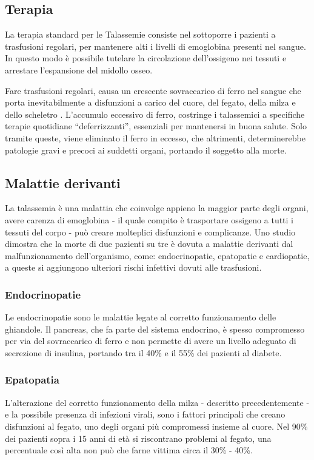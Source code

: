 \documentclass[12pt,a4paper,openright,twoside]{report}
\begin{document}
\subsection{Terapia}
La terapia standard per le Talassemie consiste nel sottoporre i pazienti a trasfusioni regolari, per mantenere alti i livelli di emoglobina presenti nel sangue. In questo modo è possibile tutelare la circolazione dell'ossigeno nei tessuti e arrestare l'espansione del midollo osseo.

Fare trasfusioni regolari, causa un crescente sovraccarico di ferro nel sangue che porta inevitabilmente a disfunzioni a carico del cuore, del fegato, della milza e dello scheletro \cite{poggi2014studio}. L'accumulo eccessivo di ferro, costringe i talassemici a specifiche terapie quotidiane ``deferrizzanti'', essenziali per mantenersi in buona salute. Solo tramite queste, viene eliminato il ferro in eccesso, che altrimenti, determinerebbe patologie gravi e precoci ai suddetti organi, portando il soggetto alla morte.

\subsection{Malattie derivanti}
La talassemia è una malattia che coinvolge appieno la maggior parte degli organi, avere carenza di emoglobina - il quale compito è trasportare ossigeno a tutti i tessuti del corpo - può creare molteplici disfunzioni e complicanze. 
Uno studio dimostra che la morte di due pazienti su tre è dovuta a malattie derivanti dal malfunzionamento dell'organismo, come: endocrinopatie, epatopatie e cardiopatie, a queste si aggiungono ulteriori rischi infettivi dovuti alle trasfusioni.

\subsubsection{Endocrinopatie}
Le endocrinopatie sono le malattie legate al corretto funzionamento delle ghiandole. Il pancreas, che fa parte del sistema endocrino, è spesso compromesso per via del sovraccarico di ferro e non permette di avere un livello adeguato di secrezione di insulina, portando tra il 40\% e il 55\% dei pazienti al diabete.

\subsubsection{Epatopatia}
L'alterazione del corretto funzionamento della milza - descritto precedentemente - e la possibile presenza di infezioni virali, sono i fattori principali che creano disfunzioni al fegato, uno degli organi più compromessi insieme al cuore. Nel 90\% dei pazienti sopra i 15 anni di età si riscontrano problemi al fegato, una percentuale così alta non può che farne vittima circa il 30\% - 40\%.
\end{document}
